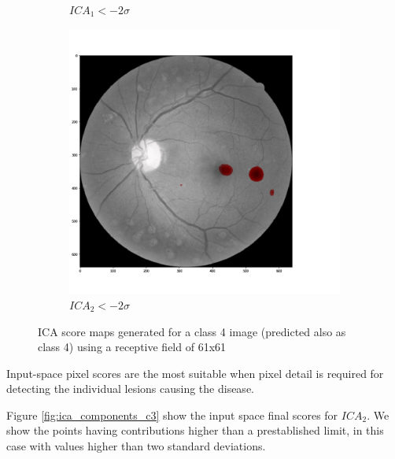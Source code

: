 \documentclass[review]{elsarticle}
\theoremstyle{definition} %
\theoremstyle{remark}
\begin{document}
\begin{figure}[h!]
\begin{subfigure}[b]{0.32\textwidth}
		\caption{$ICA_1 < - 2 \sigma$}	
	\end{subfigure}
	\begin{subfigure}[b]{0.32\textwidth}
		\centering
		\includegraphics[width=\textwidth]{./figures/img_t4_p4/rf61/ica2.png}
		\caption{$ICA_2 < - 2 \sigma$}	
	\end{subfigure}
	\hfill 
	\caption{ICA score maps generated for a class 4 image (predicted also as class 4) using a receptive field of 61x61}  
	\label{fig:ica_components_class4} 
\end{figure}

Input-space pixel scores are the most suitable when pixel detail is required for detecting the individual lesions causing the disease.

Figure \ref{fig:ica_components_c3} show the input space final scores for $ICA_2$. We show the points having contributions higher than a prestablished limit, in this case with values higher than two standard deviations. 
\end{document}
